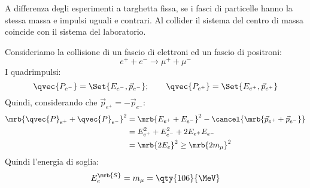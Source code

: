 \begin{example}
	A differenza degli esperimenti a targhetta fissa, se i fasci di particelle
	hanno la stessa massa e impulsi uguali e contrari. Al collider il sistema del
	centro di massa coincide con il sistema del laboratorio.

	Consideriamo la collisione di un fascio di elettroni ed un fascio di
	positroni:
	\begin{equation}
		e^+ + e^- \rightarrow \mu^+ + \mu^-
	\end{equation}
	I quadrimpulsi:
	\begin{equation}
		\qvec{P _{e^-}} = \Set{E _{e^-}, \vec{p}_{e^-}};
		\qquad
		\qvec{P _{e^+}} = \Set{E _{e^+}, \vec{p}_{e^+}}
	\end{equation}
	Quindi, considerando che $\vec{p}_{e^+} = - \vec{p}_{e^-}$:
	\begin{align}
		\mrb{\qvec{P}_{e^+} + \qvec{P}_{e^-}}^{2}
		 & = \mrb{E _{e^+} + E _{e^-}}^{2} - \cancel{\mrb{\vec{p}_{e^+} +
				\vec{p}_{e^-}}}
		\\\notag
		 & = E _{e^+}^{2} + E _{e^-}^{2} + 2 E _{e^+} E _{e^-}
		\\\notag
		 & = \mrb{2 E _{e}}^{2} \geq \mrb{2 m _{\mu}}^{2}
	\end{align}
	Quindi l'energia di soglia:
	\begin{equation}
		E _{e}^{\mrb{S}} = m _{\mu} = \qty{106}{\MeV}
	\end{equation}
\end{example}

